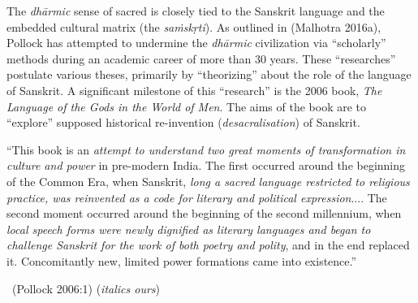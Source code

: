 The \textit{dhārmic} sense of sacred is closely tied to the Sanskrit language and the embedded cultural matrix (the \textit{saṁskṛti}). As outlined in (Malhotra 2016a), Pollock has attempted to undermine the \textit{dhārmic} civilization via “scholarly” methods during an academic career of more than 30 years. These “researches” postulate various theses, primarily by “theorizing” about the role of the language of Sanskrit. A significant milestone of this “research” is the 2006 book, \textit{The Language of the Gods in the World of Men}. The aims of the book are to “explore” supposed historical re-invention (\textit{desacralisation}) of Sanskrit.

\begin{myquote}
“This book is an \textit{attempt to understand two great moments of transformation in culture and power} in pre-modern India. The first occurred around the beginning of the Common Era, when Sanskrit, \textit{long a sacred language restricted to religious practice, was reinvented as a code for literary and political expression}.... The second moment occurred around the beginning of the second millennium, when \textit{local speech forms were newly dignified as literary languages and began to challenge Sanskrit for the work of both poetry and polity}, and in the end replaced it. Concomitantly new, limited power formations came into existence.” 

\vskip -5pt

~\hfill (Pollock 2006:1) (\textit{italics ours})
\end{myquote}


